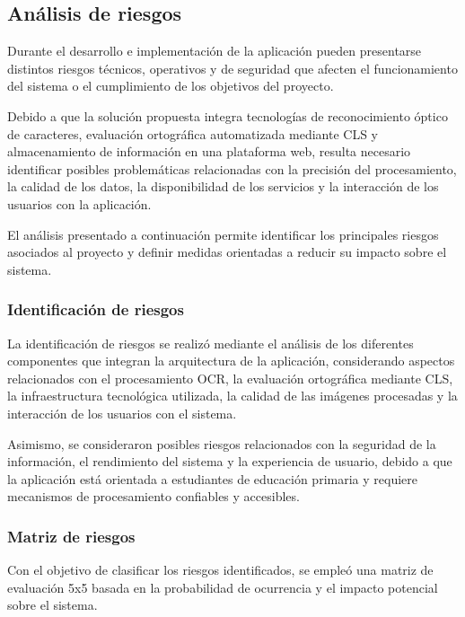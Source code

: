 \subsection{Análisis de riesgos}
\label{sec:riesgos}

Durante el desarrollo e implementación de la aplicación pueden presentarse distintos riesgos técnicos, operativos y de seguridad que afecten el funcionamiento del sistema o el cumplimiento de los objetivos del proyecto.

Debido a que la solución propuesta integra tecnologías de reconocimiento óptico de caracteres, evaluación ortográfica automatizada mediante CLS y almacenamiento de información en una plataforma web, resulta necesario identificar posibles problemáticas relacionadas con la precisión del procesamiento, la calidad de los datos, la disponibilidad de los servicios y la interacción de los usuarios con la aplicación.

El análisis presentado a continuación permite identificar los principales riesgos asociados al proyecto y definir medidas orientadas a reducir su impacto sobre el sistema.


\subsubsection{Identificación de riesgos}

La identificación de riesgos se realizó mediante el análisis de los diferentes componentes que integran la arquitectura de la aplicación, considerando aspectos relacionados con el procesamiento OCR, la evaluación ortográfica mediante CLS, la infraestructura tecnológica utilizada, la calidad de las imágenes procesadas y la interacción de los usuarios con el sistema.

Asimismo, se consideraron posibles riesgos relacionados con la seguridad de la información, el rendimiento del sistema y la experiencia de usuario, debido a que la aplicación está orientada a estudiantes de educación primaria y requiere mecanismos de procesamiento confiables y accesibles.


\subsubsection{Matriz de riesgos}

Con el objetivo de clasificar los riesgos identificados, se empleó una matriz de evaluación 5x5 basada en la probabilidad de ocurrencia y el impacto potencial sobre el sistema.


